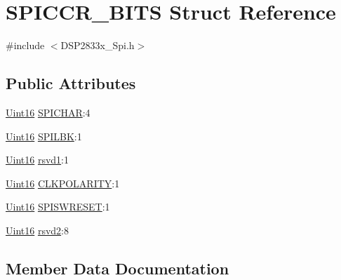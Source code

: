 \hypertarget{struct_s_p_i_c_c_r___b_i_t_s}{}\section{S\+P\+I\+C\+C\+R\+\_\+\+B\+I\+T\+S Struct Reference}
\label{struct_s_p_i_c_c_r___b_i_t_s}


{\ttfamily \#include $<$D\+S\+P2833x\+\_\+\+Spi.\+h$>$}

\subsection*{Public Attributes}
\begin{DoxyCompactItemize}
\item 
\hyperlink{_d_s_p2833x___device_8h_a59a9f6be4562c327cbfb4f7e8e18f08b}{Uint16} \hyperlink{struct_s_p_i_c_c_r___b_i_t_s_ad7c92bfe3fa4156691b074b48c9bcd71}{S\+P\+I\+C\+H\+A\+R}\+:4
\item 
\hyperlink{_d_s_p2833x___device_8h_a59a9f6be4562c327cbfb4f7e8e18f08b}{Uint16} \hyperlink{struct_s_p_i_c_c_r___b_i_t_s_a3b314f4d7704597665ec643bbbfaadc2}{S\+P\+I\+L\+B\+K}\+:1
\item 
\hyperlink{_d_s_p2833x___device_8h_a59a9f6be4562c327cbfb4f7e8e18f08b}{Uint16} \hyperlink{struct_s_p_i_c_c_r___b_i_t_s_a40804b5c1327d11a6c89f5100eb7c366}{rsvd1}\+:1
\item 
\hyperlink{_d_s_p2833x___device_8h_a59a9f6be4562c327cbfb4f7e8e18f08b}{Uint16} \hyperlink{struct_s_p_i_c_c_r___b_i_t_s_a2fac40a2b21d5a5ffa88a678aefe9718}{C\+L\+K\+P\+O\+L\+A\+R\+I\+T\+Y}\+:1
\item 
\hyperlink{_d_s_p2833x___device_8h_a59a9f6be4562c327cbfb4f7e8e18f08b}{Uint16} \hyperlink{struct_s_p_i_c_c_r___b_i_t_s_ab4c06f5a85a40d82a90265341db67d50}{S\+P\+I\+S\+W\+R\+E\+S\+E\+T}\+:1
\item 
\hyperlink{_d_s_p2833x___device_8h_a59a9f6be4562c327cbfb4f7e8e18f08b}{Uint16} \hyperlink{struct_s_p_i_c_c_r___b_i_t_s_af2001ff640ec9e3da6b6cd238c738cbb}{rsvd2}\+:8
\end{DoxyCompactItemize}


\subsection{Member Data Documentation}
\hypertarget{struct_s_p_i_c_c_r___b_i_t_s_a2fac40a2b21d5a5ffa88a678aefe9718}{}
